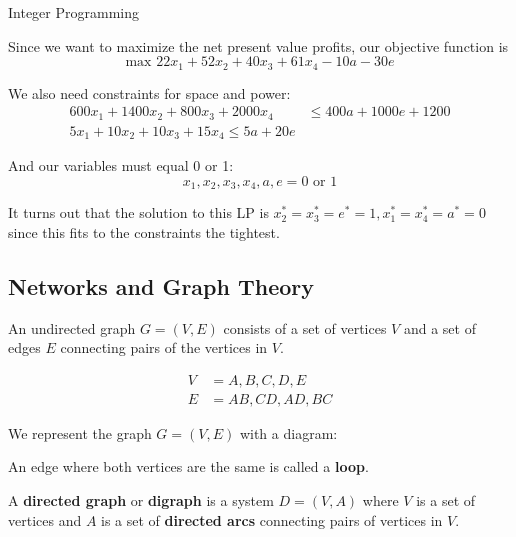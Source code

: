 \documentclass{article}
\begin{document}
\begin{section}{Integer Programming}
\begin{answer}
    Since we want to maximize the net present value profits, our objective function is 
    \[
        \text{max }22x_1+52x_2+40x_3+61x_4-10a-30e
    \]

    We also need constraints for space and power: 
    \begin{align*}
        600x_1+1400x_2+800x_3+2000x_4 &\leq 400a+1000e+1200 \\
        5x_1+10x_2+10x_3+15x_4\leq 5a+20e
    \end{align*}

    And our variables must equal 0 or 1: \\
    \[
        x_1,x_2,x_3,x_4,a,e =0 \text{ or } 1
    \]

    It turns out that the solution to this LP is \(x_2^*=x_3^*=e^*=1, x_1^*=x_4^*=a^*=0\) since this 
    fits to the constraints the tightest. 
\end{answer}

\section{Networks and Graph Theory}
\begin{definition}
    An undirected graph \(G=(V, E)\) consists of a set of vertices \(V\) and a set of 
    edges \(E\) connecting pairs of the vertices in \(V\).  
\end{definition}

\begin{eg}
    \begin{align*}
        V&={A,B,C,D,E} \\
        E&={AB, CD, AD, BC}
    \end{align*}

    We represent the graph \(G=(V,E)\) with a diagram: 

\end{eg}

An edge where both vertices are the same is called a \textbf{loop}. 

\begin{definition}
    A \textbf{directed graph} or \textbf{digraph} is a system \(D=(V,A)\) where \(V\) is 
    a set of vertices and \(A\) is a set of \textbf{directed arcs} connecting pairs of vertices in \(V\). 
\end{definition}


\end{section}
\end{document}
